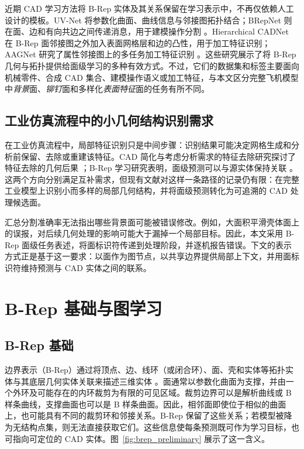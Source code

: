 \documentclass[12pt,a4paper]{ctexart}
\begin{document}
近期 CAD 学习方法将 B-Rep 实体及其关系保留在学习表示中，不再仅依赖人工设计的模板。UV-Net 将参数化曲面、曲线信息与邻接图拓扑结合；BRepNet 则在面、边和有向共边之间传递消息，用于建模操作分割 \parencite{jayaraman2021uvnet,lambourne2021brepnet}。Hierarchical CADNet 在 B-Rep 面邻接图之外加入表面网格层和边的凸性，用于加工特征识别；AAGNet 研究了属性邻接图上的多任务加工特征识别 \parencite{colligan2022hierarchical,wu2024aagnet}。这些研究展示了将 B-Rep 几何与拓扑提供给面级学习的多种有效方式。不过，它们的数据集和标签主要面向机械零件、合成 CAD 集合、建模操作语义或加工特征，与本文区分完整飞机模型中\textit{背景}面、\textit{铆钉}面和多样化\textit{表面特征}面的任务有所不同。

\subsection{工业仿真流程中的小几何结构识别需求}

在工业仿真流程中，局部特征识别只是中间步骤：识别结果可能决定网格生成和分析前保留、去除或重建该特征。CAD 简化与考虑分析需求的特征去除研究探讨了特征去除的几何后果 \parencite{thakur2009cad_simplification,antolin2024analysis_aware_defeaturing}；B-Rep 学习研究表明，面级预测可以与源实体保持关联 \parencite{jayaraman2021uvnet,lambourne2021brepnet,yeo2021machining}。这两个方向分别满足互补需求，但现有文献对这样一条路径的记录仍有限：在完整工业模型上识别小而多样的局部几何结构，并将面级预测转化为可追溯的 CAD 处理候选面。

汇总分割准确率无法指出哪些背景面可能被错误修改。例如，大面积平滑壳体面上的误报，对后续几何处理的影响可能大于漏掉一个局部目标。因此，本文采用 B-Rep 面级任务表述，将面标识符传递到处理阶段，并逐机报告错误。下文的表示方式正是基于这一要求：以面作为图节点，以共享边界提供局部上下文，并用面标识符维持预测与 CAD 实体之间的联系。


\section{B-Rep 基础与图学习}\label{sec:methods}

\subsection{B-Rep 基础}\label{sec:brep_preliminary}

边界表示（B-Rep）通过将顶点、边、线环（或闭合环）、面、壳和实体等拓扑实体与其底层几何实体关联来描述三维实体 \parencite{iso10303_42_2025}。面通常以参数化曲面为支撑，并由一个外环及可能存在的内环裁剪为有限的可见区域。裁剪边界可以是解析曲线或 B 样条曲线，支撑曲面也可以是 B 样条曲面。因此，相邻面即使位于相似的曲面上，也可能具有不同的裁剪环和邻接关系。B-Rep 保留了这些关系；若模型被降为无结构点集，则无法直接获取它们。这些信息使每条预测既可作为学习目标，也可指向可定位的 CAD 实体。图~\ref{fig:brep_preliminary} 展示了这一含义。
\end{document}

